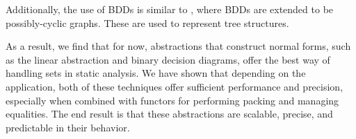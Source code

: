 Additionally, the use of BDDs is similar to \cite{mauborgne:thesis:99}, where BDDs are extended to be possibly-cyclic graphs.  These are used to represent tree structures.


As a result, we find that for now, abstractions that construct normal forms, such as the linear abstraction and binary decision diagrams, offer the best way of handling sets in static analysis.  We have shown that depending on the application, both of these techniques offer sufficient performance and precision, especially when combined with functors for performing packing and managing equalities.  The end result is that these abstractions are scalable, precise, and predictable in their behavior.